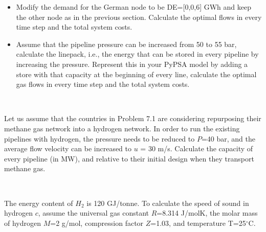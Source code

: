 \documentclass[10pt]{article}
\newenvironment{problem}[2][Problem]{\begin{trivlist}
\item[\hskip \labelsep {\bfseries #1}\hskip \labelsep {\bfseries #2.}]}{\end{trivlist}}
\begin{document}
\begin{problem}{7.1}
\begin{itemize}
\item[e)] Modify the demand for the German node to be DE=[0,0,6] GWh and keep the other node as in the previous section. Calculate the optimal flows in every time step and the total system costs.

\item[f)] Assume that the pipeline pressure can be increased from 50 to 55 bar, calculate the linepack, i.e., the energy that can be stored in every pipeline by increasing the pressure. Represent this in your PyPSA model by adding a store with that capacity at the beginning of every line, calculate the optimal gas flows in every time step and the total system costs.

\end{itemize}


\end{problem}

\

\begin{problem}{7.2}
Let us assume that the countries in Problem 7.1 are considering repurposing their methane gas network into a hydrogen network. In order to run the existing pipelines with hydrogen, the pressure needs to be reduced to $P$=40 bar, and the average flow velocity can be increased to $u$ = 30 m/s. Calculate the capacity of every pipeline (in MW), and relative to their initial design when they transport methane gas. 

\

The energy content of $H_2$ is 120 GJ/tonne. To calculate the speed of sound in hydrogen $c$, assume the universal gas constant $R$=8.314 J/molK, the molar mass of hydrogen $M$=2 g/mol, compression factor $Z$=1.03, and temperature T=25$^{\circ}$C.


\end{problem}

\
\end{document}
